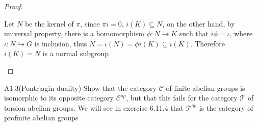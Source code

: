 \documentclass[main]{subfiles}
\begin{document}
\begin{proof}
\begin{center}
\end{center}
Let $N$ be the kernel of $\pi$, since $\pi i=0$, $i(K)\subseteq N$, on the other hand, by universal property, there is a homomorphism $\phi:N\to K$ such that $i\phi=\iota$, where $\iota:N\hookrightarrow G$ is inclusion, thus $N=\iota(N)=\phi i(K)\subseteq i(K)$. Therefore $i(K)=N$ is a normal subgroup
\begin{center}
\end{center}
\end{proof}

\begin{customexercise}{A1.3}(Pontrjagin duality)
Show that the category $\mathcal C$ of finite abelian groups is isomorphic to its opposite category $\mathcal C^{op}$, but that this fails for the category $\mathcal T$ of torsion abelian groups. We will see in exercise 6.11.4 that $\mathcal T^{op}$ is the category of profinite abelian groups
\end{customexercise}
\end{document}
